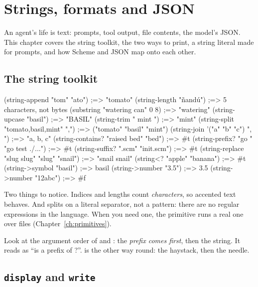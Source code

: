 \chapter{Strings, formats and JSON}
\label{ch:strings}

An agent's life is text: prompts, tool output, file contents, the model's
JSON. This chapter covers the string toolkit, the two ways to print, a
string literal made for prompts, and how Scheme and JSON map onto each
other.

\section{The string toolkit}

\begin{scm}
(string-append "tom" "ato")                  ;=> "tomato"
(string-length "ñandú")                      ;=> 5      characters, not bytes
(substring "watering can" 0 8)               ;=> "watering"
(string-upcase "basil")                      ;=> "BASIL"
(string-trim "  mint \n")                    ;=> "mint"
(string-split "tomato,basil,mint" ",")       ;=> ("tomato" "basil" "mint")
(string-join '("a" "b" "c") ", ")            ;=> "a, b, c"
(string-contains? "raised bed" "bed")        ;=> #t
(string-prefix? "go " "go test ./...")       ;=> #t
(string-suffix? ".scm" "init.scm")           ;=> #t
(string-replace "slug slug" "slug" "snail")  ;=> "snail snail"
(string<? "apple" "banana")                  ;=> #t
(string->symbol "basil")                     ;=> basil
(string->number "3.5")                       ;=> 3.5
(string->number "12abc")                     ;=> #f
\end{scm}

Two things to notice. Indices and lengths count \emph{characters}, so
accented text behaves. And  splits on a literal
separator, not a pattern: there are no regular expressions in the
language. When you need one, the  primitive runs a real
one over files (Chapter~\ref{ch:primitives}).

\begin{careful}
Look at the argument order of  and
: the \emph{prefix comes first}, then the string. It
reads as ``is  a prefix of ?''.
 is the other way round: the haystack, then the
needle.
\end{careful}

\section{\texttt{display} and \texttt{write}}

